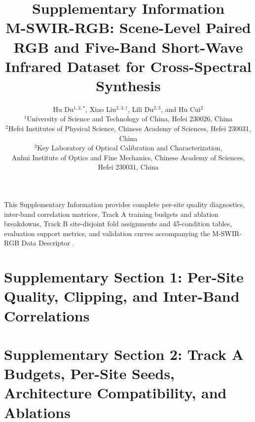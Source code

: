 \documentclass[a4paper,10pt]{article}
\title{\textbf{Supplementary Information}\\[0.35em]\large M-SWIR-RGB: Scene-Level Paired RGB and Five-Band Short-Wave Infrared Dataset for Cross-Spectral Synthesis}
\author{Hu Du$^{1,2,*}$, Xiao Liu$^{2,3,\dagger}$, Lili Du$^{2,3}$, and Hu Cui$^{2}$\\[0.3em]
\small $^{1}$University of Science and Technology of China, Hefei 230026, China\\
\small $^{2}$Hefei Institutes of Physical Science, Chinese Academy of Sciences, Hefei 230031, China\\
\small $^{3}$Key Laboratory of Optical Calibration and Characterization,\\
\small Anhui Institute of Optics and Fine Mechanics, Chinese Academy of Sciences, Hefei 230031, China}
\date{}
\begin{document}
\maketitle

This Supplementary Information provides complete per-site quality diagnostics, inter-band correlation matrices, Track A training budgets and ablation breakdowns, Track B site-disjoint fold assignments and 45-condition tables, evaluation support metrics, and validation curves accompanying the M-SWIR-RGB Data Descriptor \cite{du2026mswirrgb_data}.

\section*{Supplementary Section 1: Per-Site Quality, Clipping, and Inter-Band Correlations}

\begin{table}[htbp]\centering\footnotesize\setlength{\tabcolsep}{3pt}
\caption{Per-site clipping shares and cross-modal greyscale alignment (4:1 windows).}\label{tab:s-quality-scene}

\end{table}

\begin{table}[htbp]\centering\small
\caption{Pairwise SWIR inter-band Pearson correlation ranges across ten sites.}\label{tab:s-quality-corr}

\end{table}

\clearpage
\section*{Supplementary Section 2: Track A Budgets, Per-Site Seeds, Architecture Compatibility, and Ablations}
\end{document}
